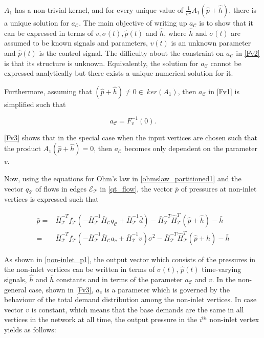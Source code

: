 $A_1$ has a non-trivial kernel, and for every unique value of $\frac{1}{\sigma^2} A_1 (\hat{p}+\hat{h}) $, there is a unique solution for $a_{\mathcal{C}}$. The main objective of writing up $a_{\mathcal{C}}$ is to show that it can be expressed in terms of $v, \sigma(t), \hat{p}(t)$ and $\hat{h}$, where $\hat{h}$ and $\sigma(t)$ are assumed to be known signals and parameters, $v(t)$ is an unknown parameter and $\hat{p}(t)$ is the control signal. The difficulty about the constraint on $a_{\mathcal{C}}$ in \eqref{Fv2} is that its structure is unknown. Equivalently, the solution for $a_{\mathcal{C}}$ cannot be expressed analytically but there exists a unique numerical solution for it.  

Furthermore, assuming that $(\hat{p} + \hat{h}) \neq 0 \in \: ker(A_1)$, then $a_{\mathcal{C}}$ in \eqref{Fv1} is simplified such that 

\begin{equation}
\label{Fv3}
a_{\mathcal{C}} = F_v^{-1} (0).
\end{equation}

\eqref{Fv3} shows that in the special case when the input vertices are chosen such that the product $A_1 (\hat{p} + \hat{h}) = 0$, then $a_{\mathcal{C}}$ becomes only dependent on the parameter $v$. 

Now, using the equations for Ohm's law in \eqref{ohmslaw_partitioned1} and the vector $q_{\mathcal{T}}$ of flows in edges $\mathcal{E}_{\mathcal{T}}$ in \eqref{qt_flow}, the vector $\bar{p}$ of pressures at non-inlet vertices is expressed such that

\begin{equation}
\begin{split}
  \label{non-inlet_p1}
  \bar{p} = & \bar{H}^{-T}_{\mathcal{T}}f_{\mathcal{T}}(-\bar{H}^{-1}_{\mathcal{T}} \bar{H}_{\mathcal{C}} q_\mathcal{C} + \bar{H}^{-1}_{\mathcal{T}} \bar{d}) - \bar{H}^{-T}_{\mathcal{T}}\hat{H}^{T}_{\mathcal{T}} (\hat{p} + \hat{h}) - \bar{h} \\
  =&\bar{H}^{-T}_{\mathcal{T}}f_{\mathcal{T}}(-\bar{H}^{-1}_{\mathcal{T}} \bar{H}_{\mathcal{C}} a_c + \bar{H}^{-1}_{\mathcal{T}} v)\sigma^2 - \bar{H}^{-T}_{\mathcal{T}}\hat{H}^{T}_{\mathcal{T}} (\hat{p} + \hat{h}) - \bar{h}
\end{split}
\end{equation}

As shown in \eqref{non-inlet_p1}, the output vector which consists of the pressures in the non-inlet vertices can be written in terms of $\sigma(t)$, $\hat{p}(t)$ time-varying signals, $\hat{h}$ and $\bar{h}$ constants and in terms of the parameter $a_{\mathcal{C}}$ and $v$. In the non-general case, shown in \eqref{Fv3}, $a_c$ is a parameter which is governed by the behaviour of the total demand distribution among the non-inlet vertices. In case vector $v$ is constant, which means that the base demands are the same in all vertices in the network at all time, the output pressure in the $i^{th}$ non-inlet vertex yields as follows: 

